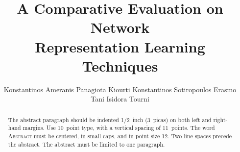 \documentclass{article} %
\title{A Comparative Evaluation on Network \\Representation Learning Techniques}
\author{Konstantinos Ameranis \And Panagiota Kiourti \And Konstantinos Sotiropoulos \AND Erasmo Tani \And Isidora Tourni}
\begin{document}
\maketitle

\begin{abstract}
The abstract paragraph should be indented 1/2~inch (3~picas) on both left and
right-hand margins. Use 10~point type, with a vertical spacing of 11~points.
The word \textsc{Abstract} must be centered, in small caps, and in point size 12. Two
line spaces precede the abstract. The abstract must be limited to one
paragraph.
\end{abstract}











\end{document}

